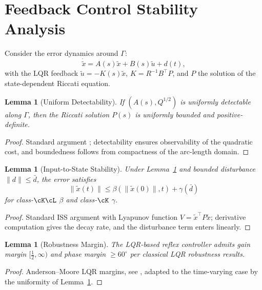\documentclass[11pt,twocolumn]{article}
\newtheorem{lemma}[theorem]{Lemma}
\theoremstyle{definition}
\theoremstyle{remark}
\begin{document}
\section{Feedback Control Stability Analysis}
\label{app:stability}

Consider the error dynamics around $\Gamma$:
\begin{equation}
\dot{\tilde x} = A(s)\tilde x + B(s)\tilde u + d(t),
\end{equation}
with the LQR feedback $\tilde u = -K(s)\tilde x$, $K = R^{-1}B^{\top}P$, and $P$ the solution of the state-dependent Riccati equation.

\begin{lemma}[Uniform Detectability]\label{lem:detect}
If $(A(s), Q^{1/2})$ is uniformly detectable along $\Gamma$, then the Riccati solution $P(s)$ is uniformly bounded and positive-definite.
\end{lemma}

\begin{proof}
Standard argument \cite{bryson1975applied,kirk2012optimal}; detectability ensures observability of the quadratic cost, and boundedness follows from compactness of the arc-length domain.
\end{proof}

\begin{lemma}[Input-to-State Stability]\label{lem:iss}
Under Lemma~\ref{lem:detect} and bounded disturbance $\|d\| \le \bar d$, the error satisfies
\begin{equation}
\|\tilde x(t)\| \le \beta(\|\tilde x(0)\|, t) + \gamma(\bar d)
\end{equation}
for class-$\cK\cL$ $\beta$ and class-$\cK$ $\gamma$.
\end{lemma}

\begin{proof}
Standard ISS argument with Lyapunov function $V = \tilde x^{\top} P \tilde x$; derivative computation gives the decay rate, and the disturbance term enters linearly.
\end{proof}

\begin{lemma}[Robustness Margin]\label{lem:robust}
The LQR-based reflex controller admits gain margin $[\tfrac{1}{2}, \infty)$ and phase margin $\ge 60^{\circ}$ per classical LQR robustness results.
\end{lemma}

\begin{proof}
Anderson--Moore LQR margins, see \cite{anderson1971linear}, adapted to the time-varying case by the uniformity of Lemma~\ref{lem:detect}.
\end{proof}
\end{document}
